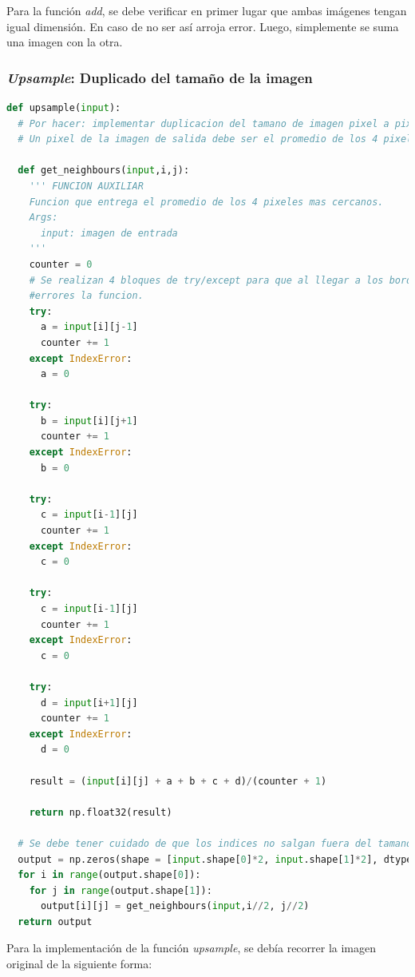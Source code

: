 \documentclass[12pt, letterpaper]{article}
\begin{document}
\par Para la función \textit{add}, se debe verificar en primer lugar que ambas imágenes tengan igual dimensión. En caso de no ser así arroja error. Luego, simplemente se suma una imagen con la otra. 

\subsubsection{\textit{Upsample}: Duplicado del tamaño de la imagen}
\begin{lstlisting}[language=Python, label = upsampleCode, caption=Función \textit{upsample}.]
def upsample(input):
  # Por hacer: implementar duplicacion del tamano de imagen pixel a pixel
  # Un pixel de la imagen de salida debe ser el promedio de los 4 pixeles mas cercanos de la imagen de entrada

  def get_neighbours(input,i,j):
    ''' FUNCION AUXILIAR
    Funcion que entrega el promedio de los 4 pixeles mas cercanos.
    Args: 
      input: imagen de entrada
    '''
    counter = 0
    # Se realizan 4 bloques de try/except para que al llegar a los bordes, no arroje
    #errores la funcion. 
    try:
      a = input[i][j-1]
      counter += 1
    except IndexError:
      a = 0
    
    try:
      b = input[i][j+1]
      counter += 1
    except IndexError:
      b = 0

    try:
      c = input[i-1][j]
      counter += 1
    except IndexError:
      c = 0
    
    try:
      c = input[i-1][j]
      counter += 1
    except IndexError:
      c = 0

    try:
      d = input[i+1][j]
      counter += 1
    except IndexError:
      d = 0

    result = (input[i][j] + a + b + c + d)/(counter + 1)
    
    return np.float32(result)

  # Se debe tener cuidado de que los indices no salgan fuera del tamano de la imagen
  output = np.zeros(shape = [input.shape[0]*2, input.shape[1]*2], dtype = np.float32)
  for i in range(output.shape[0]):
    for j in range(output.shape[1]):
      output[i][j] = get_neighbours(input,i//2, j//2)
  return output
\end{lstlisting}

\par Para la implementación de la función \textit{upsample}, se debía recorrer la imagen original de la siguiente forma:
\end{document}
